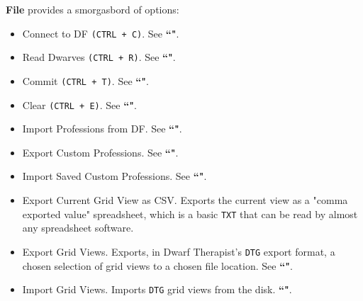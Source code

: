 \documentclass[]{article}
\begin{document}
\noindent \textbf{File} provides a smorgasbord of options:
\begin{itemize}
\item Connect to DF \texttt{(CTRL + C)}. See \textbf{``"}.

\item Read Dwarves \texttt{(CTRL + R)}. See \textbf{``"}.


\item Commit \texttt{(CTRL + T)}. See \textbf{``"}.


\item Clear \texttt{(CTRL + E)}. See \textbf{``"}.


\item Import Professions from DF. See \textbf{``"}.


\item Export Custom Professions. See \textbf{``"}.


\item Import Saved Custom Professions. See \textbf{``"}.


\item Export Current Grid View as CSV. Exports the current view as a "comma exported value"
spreadsheet, which is a basic \texttt{TXT} that can be read by almost any spreadsheet software.


\item Export Grid Views. Exports, in Dwarf Therapist's \texttt{DTG} export format, a chosen selection
of grid views to a chosen file location.
See \textbf{``"}.

\item Import Grid Views. Imports \texttt{DTG} grid views from the disk.
\textbf{``"}.

\end{itemize}
\end{document}
